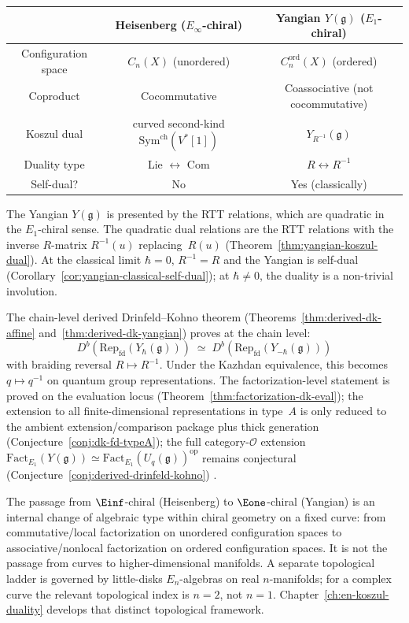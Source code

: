 \begin{center}
\small
\begin{tabular}{c|c|c}
& \textbf{Heisenberg}
 ($E_\infty$-chiral) &
\textbf{Yangian} $Y(\mathfrak{g})$
 ($E_1$-chiral) \\
\hline
Configuration space & $C_n(X)$ (unordered)
 & $C_n^{\mathrm{ord}}(X)$ (ordered) \\
Coproduct & Cocommutative
 & Coassociative (not cocommutative) \\
Koszul dual & curved second-kind $\mathrm{Sym}^{\mathrm{ch}}(V^*[1])$
 & $Y_{R^{-1}}(\mathfrak{g})$ \\
Duality type & Lie $\leftrightarrow$ Com
 & $R \leftrightarrow R^{-1}$ \\
Self-dual? & No & Yes (classically)
\end{tabular}
\end{center}

The Yangian $Y(\mathfrak{g})$ is presented by the RTT relations,
which are quadratic in the $E_1$-chiral sense. The quadratic
dual relations are the RTT relations with the inverse $R$-matrix
$R^{-1}(u)$ replacing~$R(u)$
(Theorem~\ref{thm:yangian-koszul-dual}). At the classical limit
$\hbar = 0$, $R^{-1} = R$ and the Yangian is self-dual
(Corollary~\ref{cor:yangian-classical-self-dual}); at $\hbar \neq 0$,
the duality is a non-trivial involution.

The chain-level derived Drinfeld--Kohno theorem
(Theorems~\ref{thm:derived-dk-affine}
and~\ref{thm:derived-dk-yangian}) proves at the chain level:
\begin{equation}\label{eq:frame-derived-dk}
D^b(\mathrm{Rep}_{\mathrm{fd}}(Y_\hbar(\mathfrak{g})))
\;\simeq\;
D^b(\mathrm{Rep}_{\mathrm{fd}}(Y_{-\hbar}(\mathfrak{g})))
\end{equation}
with braiding reversal $R \mapsto R^{-1}$. Under the Kazhdan
equivalence, this becomes $q \mapsto q^{-1}$ on quantum group
representations. The factorization-level statement is proved on
the evaluation locus (Theorem~\ref{thm:factorization-dk-eval});
the extension to all finite-dimensional representations in type~$A$
is only reduced to the ambient extension/comparison package plus thick
generation (Conjecture~\ref{conj:dk-fd-typeA}); the full
category-$\mathcal{O}$ extension
$\mathrm{Fact}_{E_1}(Y(\mathfrak{g}))
\simeq \mathrm{Fact}_{E_1}(U_q(\mathfrak{g}))^{\mathrm{op}}$
remains conjectural \ifannalsedition\else
(Conjecture~\ref{conj:derived-drinfeld-kohno})
\fi.

The passage from $\Einf$-chiral (Heisenberg) to $\Eone$-chiral
(Yangian) is an internal change of algebraic type within chiral
geometry on a fixed curve: from commutative/local factorization on
unordered configuration spaces to associative/nonlocal factorization on
ordered configuration spaces. It is not the passage from curves to
higher-dimensional manifolds. A separate topological ladder is
governed by little-disks $E_n$-algebras on real $n$-manifolds; for a
complex curve the relevant topological index is $n = 2$, not $n = 1$.
Chapter~\ref{ch:en-koszul-duality} develops that distinct topological
framework.


